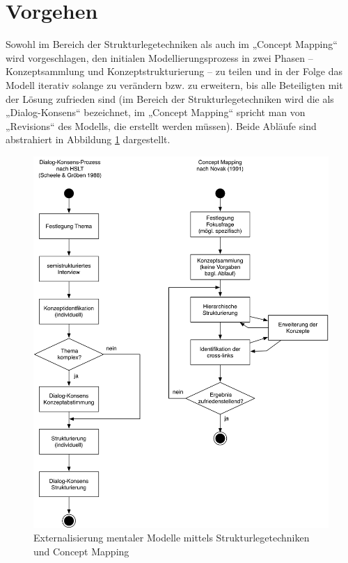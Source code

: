 \section{Vorgehen} %
\label{sub:vorgehen}

Sowohl im Bereich der Strukturlegetechniken als auch im „Concept Mapping“ wird vorgeschlagen, den initialen Modellierungsprozess in zwei Phasen -- Konzeptsammlung und Konzeptstrukturierung -- zu teilen und in der Folge das Modell iterativ solange zu verändern bzw. zu erweitern, bis alle Beteiligten mit der Lösung zufrieden sind (im Bereich der Strukturlegetechniken wird die als „Dialog-Konsens“ bezeichnet, im „Concept Mapping“ spricht man von „Revisions“ des Modells, die erstellt werden müssen). Beide Abläufe sind abstrahiert in Abbildung \ref{fig:img_MentaleModelle_slt_cm} dargestellt.

\begin{figure}[htbp]
	\centering
		\includegraphics[width=\textwidth]{img/MentaleModelle/slt_cm.png}
	\caption{Externalisierung mentaler Modelle mittels Strukturlegetechniken und Concept Mapping}
	\label{fig:img_MentaleModelle_slt_cm}
\end{figure}

